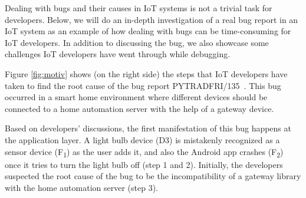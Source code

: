
Dealing with bugs and their causes in IoT systems is not a trivial task for developers. Below, we will do an in-depth investigation of a real bug report in an IoT system as an example of how dealing with bugs can be time-consuming for IoT developers. In addition to discussing the bug, we also showcase some challenges IoT developers have went through while debugging. 

Figure \ref{fig:motiv} shows (on the right side) the steps that IoT developers have taken to find the root cause of the bug report PYTRADFRI/135~\cite{iotbug:290}. This bug occurred in a smart home environment where different devices should be connected to a home automation server with the help of a gateway device.


Based on developers' discussions, the first manifestation of this bug happens at the application layer. A light bulb device (D3) is mistakenly recognized as a sensor device (F\textsubscript{1}) as the user adds it, and also the Android app crashes (F\textsubscript{2}) once it tries to turn the light bulb off (step 1 and 2). Initially, the developers suspected the root cause of the bug to be the incompatibility of a gateway library with the home automation server (step 3).



